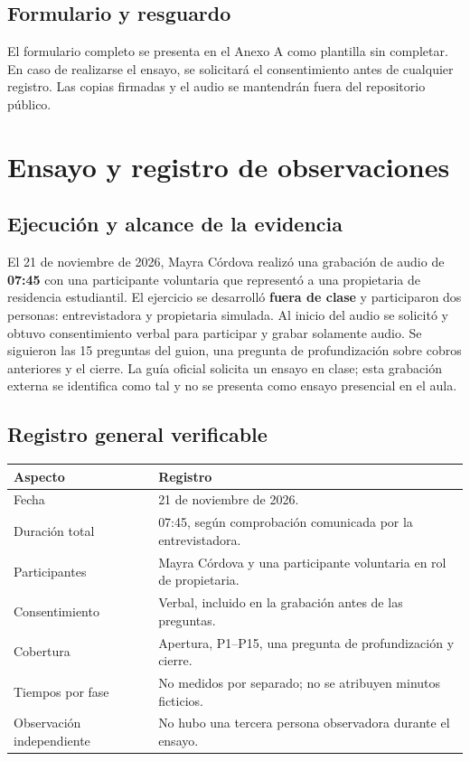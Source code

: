 \documentclass[12pt,a4paper]{article}
\begin{document}
\subsection{Formulario y resguardo}
El formulario completo se presenta en el Anexo A como plantilla sin completar. En caso de realizarse el ensayo, se solicitará el consentimiento antes de cualquier registro. Las copias firmadas y el audio se mantendrán fuera del repositorio público.

\section{Ensayo y registro de observaciones}
\subsection{Ejecución y alcance de la evidencia}
El 21 de noviembre de 2026, Mayra Córdova realizó una grabación de audio de \textbf{07:45} con una participante voluntaria que representó a una propietaria de residencia estudiantil. El ejercicio se desarrolló \textbf{fuera de clase} y participaron dos personas: entrevistadora y propietaria simulada. Al inicio del audio se solicitó y obtuvo consentimiento verbal para participar y grabar solamente audio. Se siguieron las 15 preguntas del guion, una pregunta de profundización sobre cobros anteriores y el cierre. La guía oficial solicita un ensayo en clase; esta grabación externa se identifica como tal y no se presenta como ensayo presencial en el aula.

\subsection{Registro general verificable}
\begin{tabularx}{\linewidth}{|p{4.3cm}|X|}
\hline
\textbf{Aspecto} & \textbf{Registro} \\ \hline
Fecha & 21 de noviembre de 2026. \\ \hline
Duración total & 07:45, según comprobación comunicada por la entrevistadora. \\ \hline
Participantes & Mayra Córdova y una participante voluntaria en rol de propietaria. \\ \hline
Consentimiento & Verbal, incluido en la grabación antes de las preguntas. \\ \hline
Cobertura & Apertura, P1--P15, una pregunta de profundización y cierre. \\ \hline
Tiempos por fase & No medidos por separado; no se atribuyen minutos ficticios. \\ \hline
Observación independiente & No hubo una tercera persona observadora durante el ensayo. \\ \hline
\end{tabularx}
\end{document}
